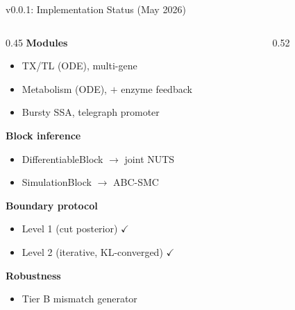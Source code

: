 \documentclass[aspectratio=169]{beamer}
\begin{document}
\begin{frame}[noframenumbering]{v0.0.1: Implementation Status (May 2026)}
	\begin{columns}[T]
		\begin{column}{0.45\textwidth}
			\footnotesize
			\textbf{Modules}
			\begin{itemize}\itemsep1pt\parskip0pt
				\item TX/TL (ODE), multi-gene
				\item Metabolism (ODE), $+$ enzyme feedback
				\item Bursty SSA, telegraph promoter
			\end{itemize}

			\smallskip
			\textbf{Block inference}
			\begin{itemize}\itemsep1pt\parskip0pt
				\item DifferentiableBlock $\to$ joint NUTS
				\item SimulationBlock $\to$ ABC-SMC
			\end{itemize}

			\smallskip
			\textbf{Boundary protocol}
			\begin{itemize}\itemsep1pt\parskip0pt
				\item Level 1 (cut posterior) $\checkmark$
				\item Level 2 (iterative, KL-converged) $\checkmark$
			\end{itemize}

			\smallskip
			\textbf{Robustness}
			\begin{itemize}\itemsep1pt\parskip0pt
				\item Tier B mismatch generator
			\end{itemize}
		\end{column}
		\begin{column}{0.52\textwidth}
			\centering
\end{column}
\end{columns}
\end{frame}
\end{document}
